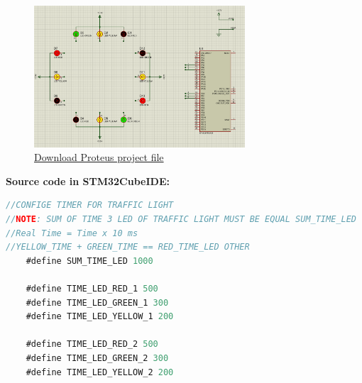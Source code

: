 \documentclass[twoside, final]{hcmut_report}
\begin{document}
\begin{figure}[ht]
    \centering
    \includegraphics[width=0.7\textwidth]{graphics/f4.png}
    \caption{
        \href{https://github.com/batmaon512/Microcontroller-251/blob/main/Lab/Lab1_LED_Animations/Source_Proteus/EX3.pdsprj}{Download Proteus project file}
    }
\end{figure}
\pagebreak
\textbf{Source code in STM32CubeIDE:}
\begin{lstlisting}[language=C, caption=Source code for Exercise 3, label=lst:ex3]
//CONFIGE TIMER FOR TRAFFIC LIGHT
//NOTE: SUM OF TIME 3 LED OF TRAFFIC LIGHT MUST BE EQUAL SUM_TIME_LED
//Real Time = Time x 10 ms
//YELLOW_TIME + GREEN_TIME == RED_TIME_LED OTHER
	#define SUM_TIME_LED 1000

	#define TIME_LED_RED_1 500
	#define TIME_LED_GREEN_1 300
	#define TIME_LED_YELLOW_1 200

	#define TIME_LED_RED_2 500
	#define TIME_LED_GREEN_2 300
	#define TIME_LED_YELLOW_2 200
\end{lstlisting}
\end{document}
